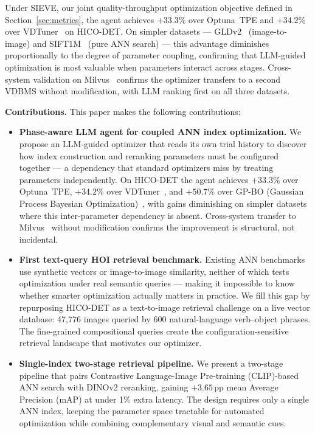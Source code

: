 \documentclass[sigconf, nonacm]{acmart}
\theoremstyle{definition}
\begin{document}
Under SIEVE, our joint quality-throughput optimization objective defined in
Section~\ref{sec:metrics}, the agent achieves $\mathbf{+33.3\%}$ over
Optuna~TPE and $\mathbf{+34.2\%}$ over VDTuner~\cite{yang2024vdtuner} on HICO-DET.
On simpler datasets --- GLDv2~\cite{weyand2020gld} (image-to-image) and
SIFT1M~\cite{jegou2011pq} (pure ANN search) --- this advantage diminishes
proportionally to the degree of parameter coupling, confirming that LLM-guided
optimization is most valuable when parameters interact across stages.
Cross-system validation on Milvus~\cite{wang2021milvus} confirms the optimizer
transfers to a second VDBMS without modification, with LLM ranking first on all
three datasets.

\noindent\textbf{Contributions.} This paper makes the following contributions:
\begin{itemize}[leftmargin=1em, itemsep=1pt, topsep=1pt]
  \item \textbf{Phase-aware LLM agent for coupled ANN index optimization.}
    We propose an LLM-guided optimizer that reads its own trial history to discover
    how index construction and reranking parameters must be configured together ---
    a dependency that standard optimizers miss by treating parameters independently.
    On HICO-DET the agent achieves $\mathbf{+33.3\%}$ over Optuna~TPE,
    $\mathbf{+34.2\%}$ over VDTuner~\cite{yang2024vdtuner}, and
    $\mathbf{+50.7\%}$ over GP-BO (Gaussian Process Bayesian Optimization)~\cite{snoek2012bayesian},
    with gains diminishing on simpler datasets where this inter-parameter dependency is absent.
    Cross-system transfer to Milvus~\cite{wang2021milvus} without modification confirms
    the improvement is structural, not incidental.

  \item \textbf{First text-query HOI retrieval benchmark.}
    Existing ANN benchmarks use synthetic vectors or image-to-image similarity, neither
    of which tests optimization under real semantic queries --- making it impossible to
    know whether smarter optimization actually matters in practice.
    We fill this gap by repurposing HICO-DET as a text-to-image retrieval challenge on
    a live vector database: 47{,}776 images queried by 600 natural-language verb--object
    phrases. The fine-grained compositional queries create the configuration-sensitive
    retrieval landscape that motivates our optimizer.

  \item \textbf{Single-index two-stage retrieval pipeline.}
    We present a two-stage pipeline that pairs Contrastive Language-Image
    Pre-training (CLIP)-based ANN search with DINOv2 reranking, gaining
    $\mathbf{+3.65}$\,pp mean Average Precision (mAP) at under 1\% extra latency.
    The design requires only a single ANN index, keeping the parameter space
    tractable for automated optimization while combining complementary visual
    and semantic cues.


\end{itemize}
\end{document}
